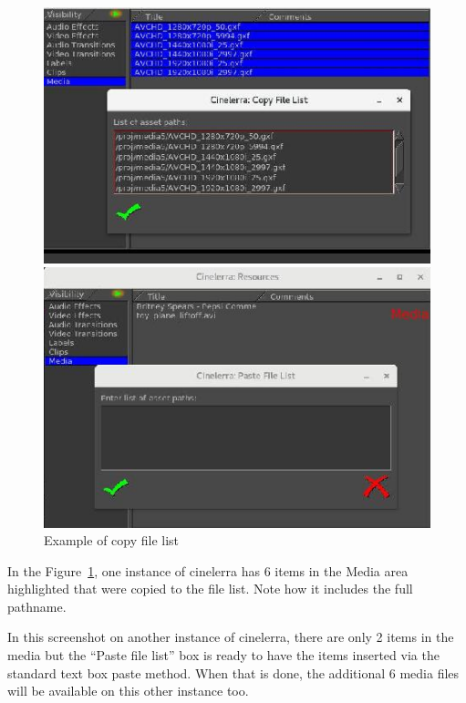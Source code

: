\begin{figure}[htpb]
    \centering
    \begin{minipage}{.49\linewidth}
    \centering
        \includegraphics[width=0.99\linewidth]{images/copy_files1.png}
    \end{minipage}
    \hfill
    \begin{minipage}{.49\linewidth}
    \centering
        \includegraphics[width=0.99\linewidth]{images/copy_files2.png}
    \end{minipage}
    \caption{Example of copy file list}
    \label{fig:copy_files1}
\end{figure}

In the Figure~\ref{fig:copy_files1}, one instance of cinelerra has 6 items in the Media area highlighted that were copied to the file list.  
Note how it includes the full pathname.

In this screenshot on another instance of cinelerra, there are only 2 items in the media but the “Paste file list” box is ready to have the items inserted via the standard text box paste method.  When that is done, the additional 6 media files will be available on this other instance too.



